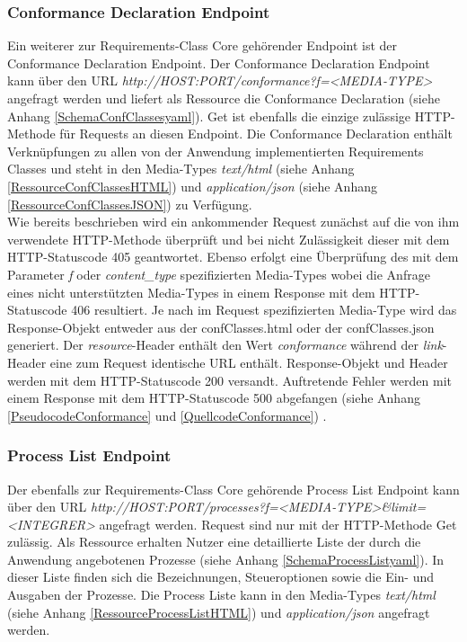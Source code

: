 \subsubsection{Conformance Declaration Endpoint}
Ein weiterer zur Requirements-Class Core gehörender Endpoint ist der Conformance Declaration Endpoint.
Der Conformance Declaration Endpoint kann über den URL \textit{http://HOST:PORT/conformance?f=<MEDIA-TYPE>} angefragt werden und liefert als 
Ressource die Conformance Declaration (siehe Anhang \ref{SchemaConfClassesyaml}). Get ist ebenfalls die einzige zulässige HTTP-Methode für Requests an diesen Endpoint.
Die Conformance Declaration enthält Verknüpfungen zu allen von der Anwendung implementierten Requirements Classes und steht in den Media-Types \textit{text/html} 
(siehe Anhang \ref{RessourceConfClassesHTML}) und \textit{application/json} (siehe Anhang \ref{RessourceConfClassesJSON}) zu Verfügung.\\

Wie bereits beschrieben wird ein ankommender Request zunächst auf die von ihm verwendete HTTP-Methode überprüft und bei nicht Zulässigkeit dieser mit dem 
HTTP-Statuscode 405 geantwortet. Ebenso erfolgt eine Überprüfung des mit dem Parameter \textit{f} oder \textit{content\_type}
spezifizierten Media-Types wobei die Anfrage eines nicht unterstützten Media-Types in einem 
Response mit dem HTTP-Statuscode 406 resultiert. Je nach im Request spezifizierten Media-Type wird das Response-Objekt entweder aus der confClasses.html oder 
der confClasses.json generiert. Der \textit{resource}-Header
enthält den Wert \textit{conformance} während der \textit{link}-Header eine zum Request identische URL enthält. Response-Objekt und Header werden mit dem 
HTTP-Statuscode 200 versandt. Auftretende Fehler werden mit einem Response mit dem HTTP-Statuscode 500 abgefangen
(siehe Anhang \ref{PseudocodeConformance} und \ref{QuellcodeConformance}) \cite{ogc_api_processes_core}.


\subsubsection{Process List Endpoint}
Der ebenfalls zur Requirements-Class Core gehörende Process List Endpoint kann über den URL \textit{http://HOST:PORT/processes?f=<MEDIA-TYPE>\&limit=<INTEGRER>} 
angefragt werden. Request sind nur mit der HTTP-Methode Get zulässig. Als Ressource erhalten Nutzer eine detaillierte Liste der durch die Anwendung angebotenen 
Prozesse (siehe Anhang \ref{SchemaProcessListyaml}). In dieser Liste finden sich die Bezeichnungen, 
Steueroptionen sowie die Ein- und Ausgaben der Prozesse. Die Process Liste kann in den Media-Types \textit{text/html} (siehe Anhang \ref{RessourceProcessListHTML}) 
und \textit{application/json} angefragt werden. \\

